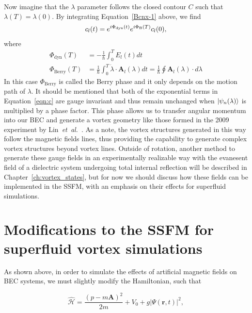 Now imagine that the $\lambda$ parameter follows the closed contour $C$ such that $\lambda(T) = \lambda(0)$. 
By integrating Equation~\eqref{Bcnx-1} above, we find
\begin{equation}
c_l(t) = e^{i \Phi_{\text{dyn}}(t)}e^{i\Phi_{\text B}(T)}c_l(0),
\label{eqn:c}
\end{equation}
where
\begin{equation}
\begin{split}
\Phi_{\text{dyn}}(T) &= - \frac{1}{\hbar}\int_0^TE_l(t)dt \\
\Phi_{\text{Berry}} (T)&= \frac{1}{\hbar} \int_0 ^T \dot{\lambda} \cdot \mathbf{A}_l(\lambda)dt = \frac{1}{\hbar}\oint\mathbf{A}_l(\lambda) \cdot d\lambda
\end{split}
\end{equation}
In this case $\Phi_{\text{Berry}}$ is called the Berry phase and it only depends on the motion path of $\lambda$. 
It should be mentioned that both of the exponential terms in Equation~\eqref{eqn:c} are gauge invariant and thus remain unchanged when $\ket{\psi_n(\lambda)}$ is multiplied by a phase factor.
This phase allows us to transfer angular momentum into our BEC and generate a vortex geometry like those formed in the 2009 experiment by Lin~\textit{et~al.}~\cite{lin2009}.
As a note, the vortex structures generated in this way follow the magnetic fields lines, thus providing the capability to generate complex vortex structures beyond vortex lines.
Outside of rotation, another method to generate these gauge fields in an experimentally realizable way with the evanesent field of a dielectric system undergoing total internal reflection will be described in Chapter~\ref{ch:vortex_states}, but for now we should discuss how these fields can be implemented in the SSFM, with an emphasis on their effects for superfluid simulations.

\section{Modifications to the SSFM for superfluid vortex simulations}
\label{sec:implementation}

As shown above, in order to simulate the effects of artificial magnetic fields on BEC systems, we must slightly modify the Hamiltonian, such that

\begin{equation}
\mathcal{\hat H} = \frac{(p-m\mathbf{A})^2}{2m} + V_0 + g|\Psi(\mathbf{r},t)|^2,
\end{equation}

